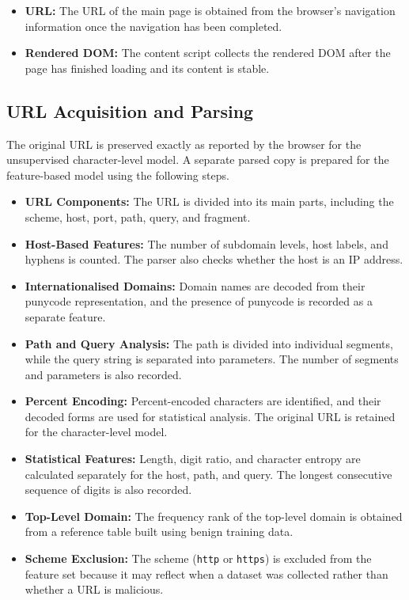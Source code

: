 \documentclass{FastFyp}
\begin{document}
\begin{itemize}
    \item \textbf{URL:} The URL of the main page is obtained from the browser's navigation information once the navigation has been completed.

    \item \textbf{Rendered DOM:} The content script collects the rendered DOM after the page has finished loading and its content is stable.
\end{itemize}

\subsection{URL Acquisition and Parsing}
\label{sec:url-parsing}

The original URL is preserved exactly as reported by the browser for the unsupervised character-level model. A separate parsed copy is prepared for the feature-based model using the following steps.

\begin{itemize}
    \item \textbf{URL Components:} The URL is divided into its main parts, including the scheme, host, port, path, query, and fragment.

    \item \textbf{Host-Based Features:} The number of subdomain levels, host labels, and hyphens is counted. The parser also checks whether the host is an IP address.

    \item \textbf{Internationalised Domains:} Domain names are decoded from their punycode representation, and the presence of punycode is recorded as a separate feature.

    \item \textbf{Path and Query Analysis:} The path is divided into individual segments, while the query string is separated into parameters. The number of segments and parameters is also recorded.

    \item \textbf{Percent Encoding:} Percent-encoded characters are identified, and their decoded forms are used for statistical analysis. The original URL is retained for the character-level model.

    \item \textbf{Statistical Features:} Length, digit ratio, and character entropy are calculated separately for the host, path, and query. The longest consecutive sequence of digits is also recorded.

    \item \textbf{Top-Level Domain:} The frequency rank of the top-level domain is obtained from a reference table built using benign training data.

    \item \textbf{Scheme Exclusion:} The scheme (\texttt{http} or \texttt{https}) is excluded from the feature set because it may reflect when a dataset was collected rather than whether a URL is malicious.
\end{itemize}
\end{document}
